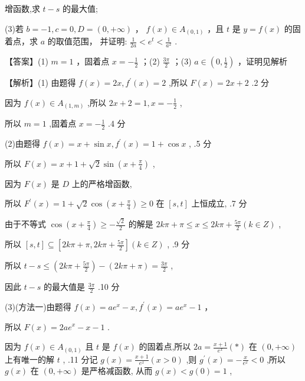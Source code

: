\documentclass[10pt]{article}
\begin{document}
增函数,求 \(t - s\) 的最大值;

(3)若 \(b =  - 1,c = 0,D = \left( {0, + \infty }\right)\) ， \(f\left( x\right)  \in  {A}_{\left( 0,1\right) }\) ，且 \(t\) 是 \(y = f\left( x\right)\) 的固着点，求 \(a\) 的取值范围， 并证明: \(\frac{1}{2a} < {e}^{t} < \frac{1}{{a}^{2}}\) .

【答案】(1) \(m = 1\) ，固着点 \(x =  - \frac{1}{2}\) ；(2) \(\frac{3\pi }{2}\) ；(3) \(a \in  \left( {0,\frac{1}{2}}\right)\) ，证明见解析

【解析】(1) 由题得 \(f\left( x\right)  = {2x},{f}^{\prime }\left( x\right)  = 2\) ,所以 \(F\left( x\right)  = {2x} + 2\) .2 分

因为 \(f\left( x\right)  \in  {A}_{\left( 1,m\right) }\) ,所以 \({2x} + 2 = 1,x =  - \frac{1}{2}\) ,

所以 \(m = 1\) ,固着点 \(x =  - \frac{1}{2}\) .4 分

(2)由题得 \(f\left( x\right)  = x + \sin x,{f}^{\prime }\left( x\right)  = 1 + \cos x\) , .5 分

所以 \(F\left( x\right)  = x + 1 + \sqrt{2}\sin \left( {x + \frac{\pi }{4}}\right)\) ,

因为 \(F\left( x\right)\) 是 \(D\) 上的严格增函数,

所以 \({F}^{\prime }\left( x\right)  = 1 + \sqrt{2}\cos \left( {x + \frac{\pi }{4}}\right)  \geq  0\) 在 \(\left\lbrack  {s,t}\right\rbrack\) 上恒成立, .7 分

由于不等式 \(\cos \left( {x + \frac{\pi }{4}}\right)  \geq   - \frac{\sqrt{2}}{2}\) 的解是 \({2k\pi } + \pi  \leq  x \leq  {2k\pi } + \frac{5\pi }{2}\left( {k \in  Z}\right)\) ,

所以 \(\left\lbrack  {s,t}\right\rbrack   \subseteq  \left\lbrack  {{2k\pi } + \pi ,{2k\pi } + \frac{5\pi }{2}}\right\rbrack  \left( {k \in  Z}\right)\) , .9 分

所以 \(t - s \leq  \left( {{2k\pi } + \frac{5\pi }{2}}\right)  - \left( {{2k\pi } + \pi }\right)  = \frac{3\pi }{2}\) ,

因此 \(t - s\) 的最大值是 \(\frac{3\pi }{2}\) .10 分

(3)(方法一)由题得 \(f\left( x\right)  = a{e}^{x} - x,{f}^{\prime }\left( x\right)  = a{e}^{x} - 1\) ，

所以 \(F\left( x\right)  = {2a}{e}^{x} - x - 1\) .

因为 \(f\left( x\right)  \in  {A}_{\left( 0,1\right) }\) 且 \(t\) 是 \(f\left( x\right)\) 的固着点,所以 \({2a} = \frac{x + 1}{{e}^{x}}\left( *\right)\) 在 \(\left( {0, + \infty }\right)\) 上有唯一的解 \(t\) , .11 分记 \(g\left( x\right)  = \frac{x + 1}{{e}^{x}}\left( {x > 0}\right)\) ,则 \({g}^{\prime }\left( x\right)  =  - \frac{x}{{e}^{x}} < 0\) ,所以 \(g\left( x\right)\) 在 \(\left( {0, + \infty }\right)\) 是严格减函数, 从而 \(g\left( x\right)  < g\left( 0\right)  = 1\) ,
\end{document}
